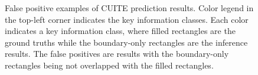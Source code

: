 \documentclass[10pt,twocolumn,letterpaper]{article}
\begin{document}
\begin{figure}
\begin{center}
\end{center}
   \caption{False positive examples of CUITE prediction results. Color legend in the top-left corner indicates the key information classes. Each color indicates a key information class, where filled rectangles are the ground truths while the boundary-only rectangles are the inference results. The false positives are results with the boundary-only rectangles being not overlapped with the filled rectangles.}
\label{fig:falsepositive}
\end{figure}
\end{document}
